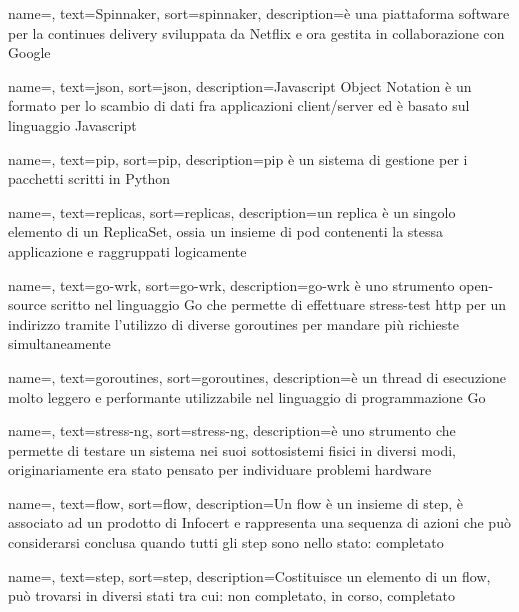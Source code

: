 {
    name=,
    text=Spinnaker,
    sort=spinnaker,
    description={è una piattaforma software per la continues delivery sviluppata da Netflix e ora gestita in collaborazione con Google}
}

{
    name=,
    text=json,
    sort=json,
    description={Javascript Object Notation è un formato per lo scambio di dati fra applicazioni client/server ed è basato sul linguaggio Javascript}
}

{
    name=,
    text=pip,
    sort=pip,
    description={pip è un sistema di gestione per i pacchetti scritti in Python}
}

{
    name=,
    text=replicas,
    sort=replicas,
    description={un replica è un singolo elemento di un ReplicaSet, ossia un insieme di pod contenenti la stessa applicazione e raggruppati logicamente}
}

{
    name=,
    text=go-wrk,
    sort=go-wrk,
    description={go-wrk è uno strumento open-source scritto nel linguaggio Go che permette di effettuare stress-test http per un indirizzo tramite l'utilizzo di diverse goroutines per mandare più richieste simultaneamente}
}

{
    name=,
    text=goroutines,
    sort=goroutines,
    description={è un thread di esecuzione molto leggero e performante utilizzabile nel linguaggio di programmazione Go}
}

{
    name=,
    text=stress-ng,
    sort=stress-ng,
    description={è uno strumento che permette di testare un sistema nei suoi sottosistemi fisici in diversi modi, originariamente era stato pensato per individuare problemi hardware}
}

{
    name=,
    text=flow,
    sort=flow,
    description={Un flow è un insieme di \gls{step}, è associato ad un prodotto di Infocert e rappresenta una sequenza di azioni che può considerarsi conclusa quando tutti gli step sono nello stato: completato}
}

{
    name=,
    text=step,
    sort=step,
    description={Costituisce un elemento di un flow, può trovarsi in diversi stati tra cui: non completato, in corso, completato}
}